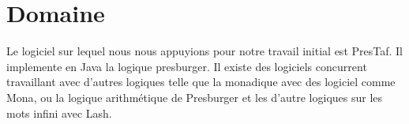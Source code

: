 \section{Domaine}

Le logiciel sur lequel nous nous appuyions pour notre travail initial est PresTaf. Il implemente en Java la logique \gls{presburger}\cite{ginsburg1966semigroups}. Il existe des logiciels concurrent travaillant avec d'autres logiques telle que la \gls{monadique}\cite{KlaEtAl:Mona} avec des logiciel comme Mona\cite{monamanual2001}, ou la logique arithmétique de Presburger et les d'autre logiques sur les mots infini avec Lash\cite{lash}.
